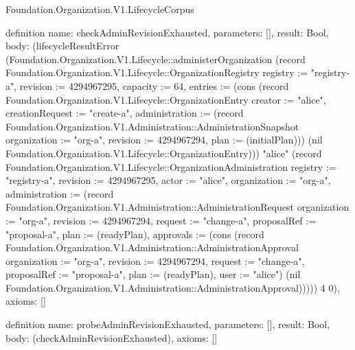 \begin{lexlean}{Foundation.Organization.V1.LifecycleCorpus}
\begin{semanticmodule}
definition{
  name: checkAdminRevisionExhausted,
  parameters: [],
  result: Bool,
  body: (lifecycleResultError (Foundation.Organization.V1.Lifecycle::administerOrganization (record Foundation.Organization.V1.Lifecycle::OrganizationRegistry {registry := "registry-a", revision := 4294967295, capacity := 64, entries := (cons (record Foundation.Organization.V1.Lifecycle::OrganizationEntry {creator := "alice", creationRequest := "create-a", administration := (record Foundation.Organization.V1.Administration::AdministrationSnapshot {organization := "org-a", revision := 4294967294, plan := (initialPlan)})}) (nil Foundation.Organization.V1.Lifecycle::OrganizationEntry))}) "alice" (record Foundation.Organization.V1.Lifecycle::OrganizationAdministration {registry := "registry-a", revision := 4294967295, actor := "alice", organization := "org-a", administration := (record Foundation.Organization.V1.Administration::AdministrationRequest {organization := "org-a", revision := 4294967294, request := "change-a", proposalRef := "proposal-a", plan := (readyPlan), approvals := (cons (record Foundation.Organization.V1.Administration::AdministrationApproval {organization := "org-a", revision := 4294967294, request := "change-a", proposalRef := "proposal-a", plan := (readyPlan), user := "alice"}) (nil Foundation.Organization.V1.Administration::AdministrationApproval))})})) 4 0),
  axioms: []
}

definition{
  name: probeAdminRevisionExhausted,
  parameters: [],
  result: Bool,
  body: (checkAdminRevisionExhausted),
  axioms: []
}


\end{semanticmodule}
\end{lexlean}
